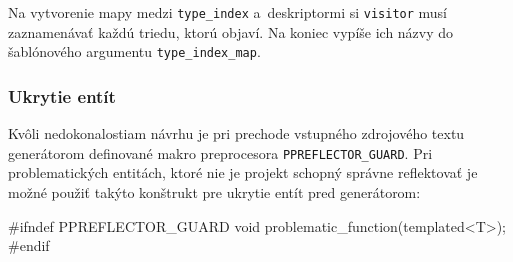 Na vytvorenie mapy medzi \texttt{type\_index} a~deskriptormi si \texttt{visitor} musí zaznamenávať každú triedu, ktorú objaví. Na koniec vypíše ich názvy do šablónového argumentu \texttt{type\_index\_map}.

\subsubsection{Ukrytie entít}

Kvôli nedokonalostiam návrhu je pri prechode vstupného zdrojového textu generátorom definované makro preprocesora \texttt{PPREFLECTOR\_GUARD}. Pri problematických entitách, ktoré nie je projekt schopný správne reflektovať je možné použiť takýto konštrukt pre ukrytie entít pred generátorom:

\begin{code}
#ifndef PPREFLECTOR_GUARD
void problematic_function(templated<T>);
#endif
\end{code}
